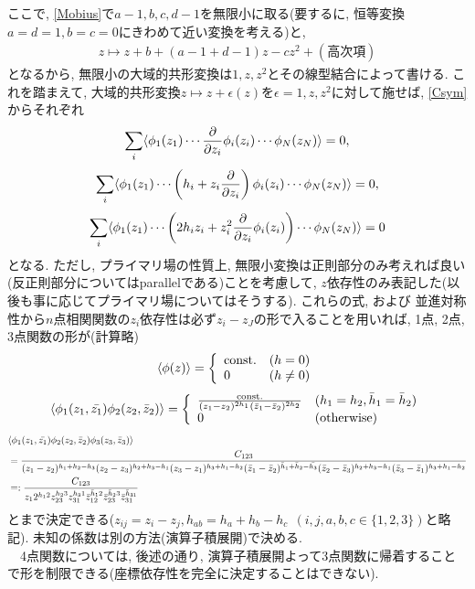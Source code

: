 ここで, \eqref{Mobius}で$a-1, b, c, d-1$を無限小に取る(要するに, 恒等変換$a=d=1, b=c=0$にきわめて近い変換を考える)と, 
\begin{align}
    z\mapsto z + b + (a-1+d-1)z -cz^2 + (高次項)
\end{align}
となるから, 無限小の大域的共形変換は$1, z, z^2$とその線型結合によって書ける. 
これを踏まえて, 大域的共形変換$z\mapsto z + \epsilon(z)$を$\epsilon=1, z, z^2$に対して施せば, \eqref{Csym}からそれぞれ
\begin{align}
    \sum_{i}\langle{\phi_1(z_1)\cdots \frac{\partial}{\partial z_i}\phi_i(z_i)\cdots \phi_N(z_N)}\rangle=0, 
\end{align}
\begin{align}
    \sum_{i}\langle{\phi_1(z_1)\cdots \left({h_i + z_i\frac{\partial}{\partial z_i}}\right)\phi_i(z_i)\cdots \phi_N(z_N)}\rangle=0, 
\end{align}
\begin{align}
    \sum_{i}\langle{\phi_1(z_1)\cdots \left({2h_i z_i + z_i^2\frac{\partial}{\partial z_i}\phi_i(z_i)}\right)\cdots \phi_N(z_N)}\rangle=0
\end{align}
となる. ただし, 
プライマリ場の性質上, 無限小変換は正則部分のみ考えれば良い(反正則部分についてはparallelである)ことを考慮して, 
$z$依存性のみ表記した(以後も事に応じてプライマリ場についてはそうする). 
これらの式, および
並進対称性から$n$点相関関数の$z_i$依存性は必ず$z_i-z_J$の形で入ることを用いれば, 1点, 2点, 3点関数の形が(計算略)
\begin{align}
    \langle{\phi(z)}\rangle = \left\{
    \begin{array}{ll}
    \mathrm{const. } & (h=0)\\
    0 & (h\neq 0)
    \end{array}
    \right.
\end{align}
\begin{equation}
    \langle{\phi_1(z_1, \bar{z_1})\phi_2(z_2, \bar{z}_2)}\rangle = \left\{
    \begin{array}{ll}
    \frac{\mathrm{const.}}{(z_1-z_2)^{2h_1}(\bar{z}_1-\bar{z}_2)^{2h_2}} & (h_1=h_2, \bar{h}_1 = \bar{h}_2)\\
    0 & (\mathrm{otherwise})
    \end{array}
    \right.
\end{equation}
\begin{align}
    &\langle{\phi_1(z_1, \bar{z_1})\phi_2(z_2, \bar{z}_2)\phi_3(z_3, \bar{z}_3)}\rangle\\
    &= \frac{C_{123}}{(z_1-z_2)^{h_1 + h_2 - h_3}(z_2-z_3)^{h_2 + h_3 - h_1}(z_3-z_1)^{h_3+h_1-h_2}
    (\bar{z}_1-\bar{z}_2)^{\bar{h}_1+\bar{h}_2-\bar{h_3}}(\bar{z}_2-\bar{z}_3)^{h_2 + h_3 - h_1}(\bar{z}_3-\bar{z}_1)^{h_3+ h_1-h_2}}\\
    &=: \frac{C_{123}}{z_12^{h_12}z_{23}^{h_23}z_{31}^{h_31}\bar{z}_{12}^{\bar{h}_12}\bar{z}_{23}^{\bar{h}_23}\bar{z}_{31}^{\bar{h}_{31}}}
\end{align}
とまで決定できる($z_{ij}=z_i-z_j, h_{ab}=h_a + h_b - h_c~~(i,j,a,b,c\in \{1,2,3\})$と略記). 
未知の係数は別の方法(演算子積展開)で決める. \\
　4点関数については, 後述の通り, 演算子積展開よって3点関数に帰着することで形を制限できる(座標依存性を完全に決定することはできない). 
